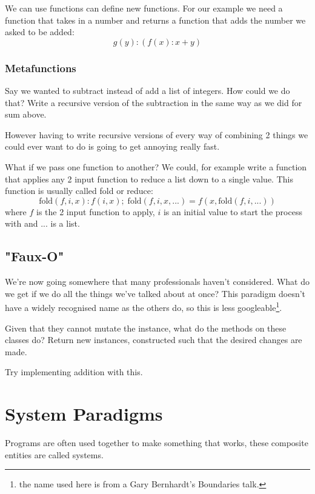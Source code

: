 \documentclass{article}
\begin{document}
We can use functions can define new functions.
For our example we need a function that takes in a number and returns a
function that adds the number we asked to be added:
\begin{displaymath}
g(y): (f(x): x + y)
\end{displaymath}

\subsubsection{Metafunctions}
Say we wanted to subtract instead of add a list of integers.
How could we do that?
Write a recursive version of the subtraction in the same way as we did for sum
above.

However having to write recursive versions of every way of combining 2 things
we could ever want to do is going to get annoying really fast.

What if we pass one function to another?
We could, for example write a function that applies any 2 input function to
reduce a list down to a single value.
This function is usually called fold or reduce:
\begin{displaymath}
\mathrm{fold}(f, i, x): f(i, x) ;\; \mathrm{fold}(f, i, x, ...) = f(x, \mathrm{fold}(f, i, ...))
\end{displaymath}
where $f$ is the 2 input function to apply, $i$ is an initial value to start
the process with and $...$ is a list.

\subsection{"Faux-O"}
We're now going somewhere that many professionals haven't considered.
What do we get if we do all the things we've talked about at once?
This paradigm doesn't have a widely recognised name as the others do, so this
is less googleable\footnote{the name used here is from a Gary Bernhardt's
Boundaries talk.}.

Given that they cannot mutate the instance, what do the methods on these
classes do?
Return new instances, constructed such that the desired changes are made.

Try implementing addition with this.

\section{System Paradigms}
Programs are often used together to make something that works, these composite
entities are called systems.
\end{document}
